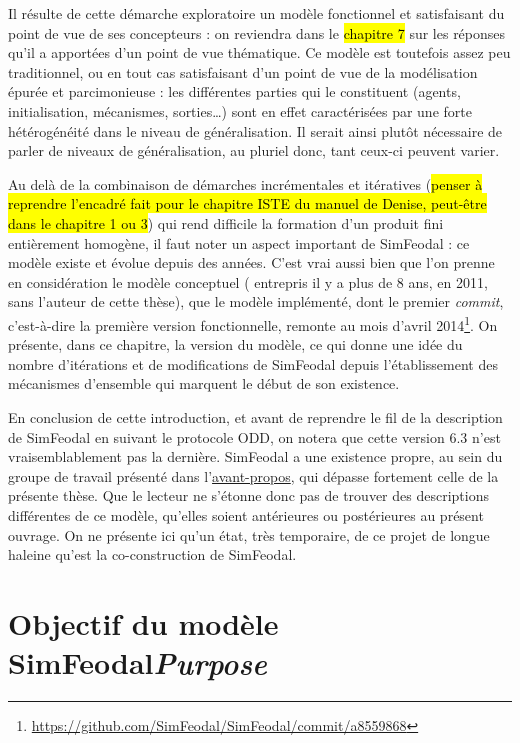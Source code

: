 Il résulte de cette démarche exploratoire un modèle fonctionnel et satisfaisant du point de vue de ses concepteurs : on reviendra dans le \hl{chapitre 7} sur les réponses qu'il a apportées d'un point de vue thématique.
Ce modèle est toutefois assez peu traditionnel, ou en tout cas satisfaisant d'un point de vue de la modélisation épurée et parcimonieuse : les différentes parties qui le constituent (agents, initialisation, mécanismes, sorties\ldots) sont en effet caractérisées par une forte hétérogénéité dans le niveau de généralisation.
Il serait ainsi plutôt nécessaire de parler de niveaux de généralisation, au pluriel donc, tant ceux-ci peuvent varier.

Au delà de la combinaison de démarches incrémentales et itératives (\hl{penser à reprendre l'encadré fait pour le chapitre ISTE du manuel de Denise, peut-être dans le chapitre 1 ou 3}) qui rend difficile la formation d'un produit fini entièrement homogène, il faut noter un aspect important de SimFeodal : ce modèle existe et évolue depuis des années.
C'est vrai aussi bien que l'on prenne en considération le modèle conceptuel ( entrepris il y a plus de 8 ans, en 2011, sans l'auteur de cette thèse), que le modèle implémenté, dont le premier \textit{commit}, c'est-à-dire la première version fonctionnelle, remonte au mois d'avril 2014\footnote{
\href{https://github.com/SimFeodal/SimFeodal/commit/a85598682cda2350b08ea789b966e613dacb1b05}{https://github.com/SimFeodal/SimFeodal/commit/a8559868}}.
On présente, dans ce chapitre, la version \fg{} du modèle, ce qui donne une idée du nombre d'itérations et de modifications de SimFeodal depuis l'établissement des mécanismes d'ensemble qui marquent le début de son existence.

En conclusion de cette introduction, et avant de reprendre le fil de la description de SimFeodal en suivant le protocole ODD, on notera que cette version 6.3 n'est vraisemblablement pas la dernière.
SimFeodal a une existence propre, au sein du groupe de travail présenté dans l'\hyperlink{avant-propos}{avant-propos}, qui dépasse fortement celle de la présente thèse.
Que le lecteur ne s'étonne donc pas de trouver des descriptions différentes de ce modèle, qu'elles soient antérieures ou postérieures au présent ouvrage.
On ne présente ici qu'un état, très temporaire, de ce projet de longue haleine qu'est la co-construction de SimFeodal.


\let\orisectionmark\sectionmark
\renewcommand\sectionmark[1]{}%
\section[Objectifs du modèle SimFeodal --  \textit{Purpose}]{Objectif du modèle SimFeodal\protect\newline \large{\textit{Purpose}}}
\orisectionmark{Objectifs}
\let\sectionmark\orisectionmark



